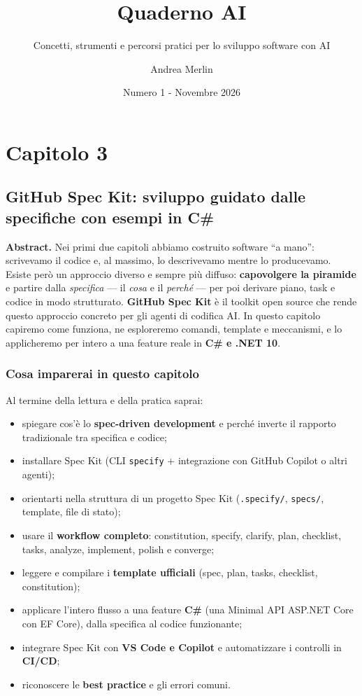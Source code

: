 \documentclass[
  italian,
  10pt,
]{book}
\title{Quaderno AI}
\subtitle{Concetti, strumenti e percorsi pratici per lo sviluppo
software con AI}
\author{Andrea Merlin}
\date{Numero 1 - Novembre 2026}
\providecommand{\tightlist}{%
  \setlength{\itemsep}{0pt}\setlength{\parskip}{0pt}}
\begin{document}
\frontmatter
\maketitle

{
\setcounter{tocdepth}{1}
\tableofcontents
}
\mainmatter
\chapter{Capitolo 3}\label{capitolo-3}

\section{GitHub Spec Kit: sviluppo guidato dalle specifiche con esempi
in
C\#}\label{github-spec-kit-sviluppo-guidato-dalle-specifiche-con-esempi-in-c}

\textbf{Abstract.} Nei primi due capitoli abbiamo costruito software ``a
mano'': scrivevamo il codice e, al massimo, lo descrivevamo mentre lo
producevamo. Esiste però un approccio diverso e sempre più diffuso:
\textbf{capovolgere la piramide} e partire dalla \emph{specifica} --- il
\emph{cosa} e il \emph{perché} --- per poi derivare piano, task e codice
in modo strutturato. \textbf{GitHub Spec Kit} è il toolkit open source
che rende questo approccio concreto per gli agenti di codifica AI. In
questo capitolo capiremo come funziona, ne esploreremo comandi, template
e meccanismi, e lo applicheremo per intero a una feature reale in
\textbf{C\# e .NET 10}.

\subsection{Cosa imparerai in questo
capitolo}\label{cosa-imparerai-in-questo-capitolo}

Al termine della lettura e della pratica saprai:

\begin{itemize}
\tightlist
\item
  spiegare cos'è lo \textbf{spec-driven development} e perché inverte il
  rapporto tradizionale tra specifica e codice;
\item
  installare Spec Kit (CLI \texttt{specify} + integrazione con GitHub
  Copilot o altri agenti);
\item
  orientarti nella struttura di un progetto Spec Kit
  (\texttt{.specify/}, \texttt{specs/}, template, file di stato);
\item
  usare il \textbf{workflow completo}: constitution, specify, clarify,
  plan, checklist, tasks, analyze, implement, polish e converge;
\item
  leggere e compilare i \textbf{template ufficiali} (spec, plan, tasks,
  checklist, constitution);
\item
  applicare l'intero flusso a una feature \textbf{C\#} (una Minimal API
  ASP.NET Core con EF Core), dalla specifica al codice funzionante;
\item
  integrare Spec Kit con \textbf{VS Code e Copilot} e automatizzare i
  controlli in \textbf{CI/CD};
\item
  riconoscere le \textbf{best practice} e gli errori comuni.
\end{itemize}
\end{document}
